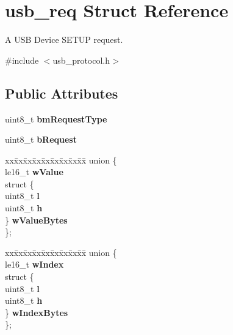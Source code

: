 \hypertarget{structusb__req}{}\section{usb\+\_\+req Struct Reference}
\label{structusb__req}


A U\+SB Device S\+E\+T\+UP request.  




{\ttfamily \#include $<$usb\+\_\+protocol.\+h$>$}

\subsection*{Public Attributes}
\begin{DoxyCompactItemize}
\item 
\mbox{\label{structusb__req_a2cf601b6ffc7e21755bcd223909643bb}} 
uint8\+\_\+t {\bfseries bm\+Request\+Type}
\item 
\mbox{\label{structusb__req_ae9de9104f87d7c078729ab1feb8fb104}} 
uint8\+\_\+t {\bfseries b\+Request}
\item 
\mbox{\label{structusb__req_a85739b39640b8a4f6f5310ec7c3afb26}} 
\begin{tabbing}
xx\=xx\=xx\=xx\=xx\=xx\=xx\=xx\=xx\=\kill
union \{\\
\>le16\_t {\bfseries wValue}\\
\>struct \{\\
\>\>uint8\_t {\bfseries l}\\
\>\>uint8\_t {\bfseries h}\\
\>\} {\bfseries wValueBytes}\\
\}; \\

\end{tabbing}\item 
\mbox{\label{structusb__req_a7e67abfdf3e4ccac1fcc97218775ae19}} 
\begin{tabbing}
xx\=xx\=xx\=xx\=xx\=xx\=xx\=xx\=xx\=\kill
union \{\\
\>le16\_t {\bfseries wIndex}\\
\>struct \{\\
\>\>uint8\_t {\bfseries l}\\
\>\>uint8\_t {\bfseries h}\\
\>\} {\bfseries wIndexBytes}\\
\}; \\


\end{tabbing}
\end{DoxyCompactItemize}
